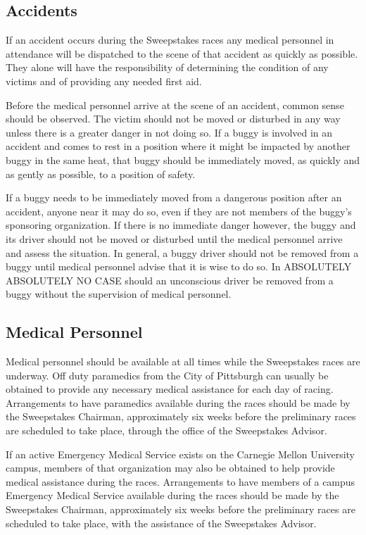 \subsection{Accidents}

If an accident occurs during the Sweepstakes races any medical personnel in attendance will be dispatched to the scene of that accident as quickly as possible. They alone will have the responsibility of determining the condition of any victims and of providing any needed first aid.

Before the medical personnel arrive at the scene of an accident, common sense should be observed. The victim should not be moved or disturbed in any way unless there is a greater danger in not doing so. If a buggy is involved in an accident and comes to rest in a position where it might be impacted by another buggy in the same heat, that buggy should be immediately moved, as quickly and as gently as possible, to a position of safety.

If a buggy needs to be immediately moved from a dangerous position after an accident, anyone near it may do so, even if they are not members of the buggy's sponsoring organization. If there is no immediate danger however, the buggy and its driver should not be moved or disturbed until the medical personnel arrive and assess the situation. In general, a buggy driver should not be removed from a buggy until medical personnel advise that it is wise to do so. In ABSOLUTELY ABSOLUTELY NO CASE should an unconscious driver be removed from a buggy without the supervision of medical personnel.

\subsection{Medical Personnel}

Medical personnel should be available at all times while the Sweepstakes races are underway. Off duty paramedics from the City of Pittsburgh can usually be obtained to provide any necessary medical assistance for each day of racing. Arrangements to have paramedics available during the races should be made by the Sweepstakes Chairman, approximately six weeks before the preliminary races are scheduled to take place, through the office of the Sweepstakes Advisor.

If an active Emergency Medical Service exists on the Carnegie Mellon University campus, members of that organization may also be obtained to help provide medical assistance during the races. Arrangements to have members of a campus Emergency Medical Service available during the races should be made by the Sweepstakes Chairman, approximately six weeks before the preliminary races are scheduled to take place, with the assistance of the Sweepstakes Advisor.

